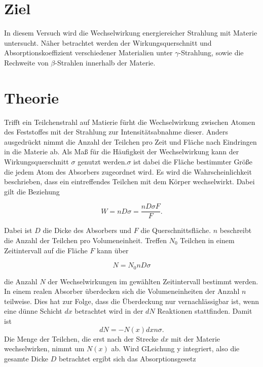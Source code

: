 \section{Ziel}
\label{sec:Ziel}

In diesem Versuch wird die Wechselwirkung energiereicher Strahlung mit Materie untersucht. Näher betrachtet werden der Wirkungsquerschnitt und Absorptionskoeffizient verschiedener Materialien unter $\gamma$-Strahlung, sowie die Rechweite von $\beta$-Strahlen innerhalb der Materie.

\section{Theorie}
\label{sec:Theorie}

Trifft ein Teilchenstrahl auf Matierie fürht die Wechselwirkung zwischen Atomen des Feststoffes mit der Strahlung zur Intensitätsabnahme dieser. Anders ausgedrückt nimmt die Anzahl der Teilchen pro Zeit und Fläche nach Eindringen in die Materie ab. Als Maß für die Häufigkeit der Wechselwirkung kann der Wirkungsquerschnitt $\sigma$ genutzt werden.$\sigma$ ist dabei die Fläche bestimmter Größe die jedem Atom des Absorbers zugeordnet wird. Es wird die Wahrscheinlichkeit beschrieben, dass ein eintreffendes Teilchen mit dem Körper wechselwirkt. Dabei gilt die Beziehung 

\begin{equation}
W=n D \sigma =\frac{n D \sigma F}{F}.
\end{equation}

Dabei ist $D$ die Dicke des Absorbers und $F$ die Querschnittsfläche. $n$ beschreibt die Anzahl der Teilchen pro Volumeneinheit.
Treffen $N_0$ Teilchen in einem Zeitintervall auf die Fläche $F$ kann über

\begin{equation}
N=N_0 n D \sigma
\end{equation}

die Anzahl $N$ der Wechselwirkungen im gewählten Zeitintervall bestimmt werden. 
In einem realen Absorber überdecken sich die Volumeneinheiten der Anzahl $n$ teilweise. Dies hat zur Folge, dass die Überdeckung nur vernachlässigbar ist, wenn eine dünne Schicht $dx$ betrachtet wird in der $dN$ Reaktionen stattfinden. Damit ist
\begin{equation}
dN=-N(x) dx n \sigma.
\end{equation}
Die Menge der Teilchen, die erst nach der Strecke $dx$ mit der Materie wechselwirken, nimmt um $N(x)$ ab. Wird GLeichung y integriert, also die gesamte Dicke $D$ betrachtet ergibt sich das Absorptionsgesetz

